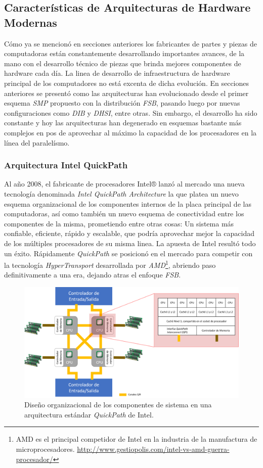 \subsection{Características de Arquitecturas de Hardware Modernas}
Cómo ya se mencionó en secciones anteriores los fabricantes de partes y piezas de computadoras están constantemente desarrollando importantes avances, de la mano con el desarrollo técnico de piezas que brinda mejores componentes de hardware cada día. La linea de desarrollo de infraestructura de hardware principal de los computadores no está excenta de dicha evolución. En secciones anteriores se presentó como las arquitecturas han evolucionado desde el primer esquema \emph{SMP} propuesto con la distribución \emph{FSB}, pasando luego por nuevas configuraciones como \emph{DIB} y \emph{DHSI}, entre otras. Sin embargo, el desarrollo ha sido constante y hoy las arquitecturas han degenerado en esquemas bastante más complejos en pos de aprovechar al máximo la capacidad de los procesadores en la línea del paralelísmo.

\subsubsection{Arquitectura Intel QuickPath}
Al año 2008, el fabricante de procesadores Intel® lanzó al mercado una nueva tecnología denominada \emph{Intel QuickPath Architecture} \cite{paper:quickpath} la que platea un nuevo esquema organizacional de los componentes internos de la placa principal de las computadoras, así como también un nuevo esquema de conectividad entre los componentes de la misma, prometiendo entre otras cosas: Un sistema más confiable, eficiente, rápido y escalable, que podría aprovechar mejor la capacidad de los múltiples procesadores de su misma linea. La apuesta de Intel resultó todo un éxito. Rápidamente \emph{QuickPath} se posicionó en el mercado para competir con la tecnología \emph{HyperTransport} desarrollada por \emph{AMD}\footnote{AMD es el principal competidor de Intel en la industria de la manufactura de microprocesadores. \url{http://www.gestiopolis.com/intel-vs-amd-guerra-procesador/}}, abriendo paso definitivamente a una era, dejando atras el enfoque \emph{FSB}.

\begin{figure}[!h]
	\centering
	\includegraphics[scale=.5]{imagenes/quickpath2.png}
	\caption{Diseño organizacional de los componentes de sistema en una arquitectura estándar \emph{QuickPath} de Intel.}
	\label{fig:quickpath}
\end{figure}

